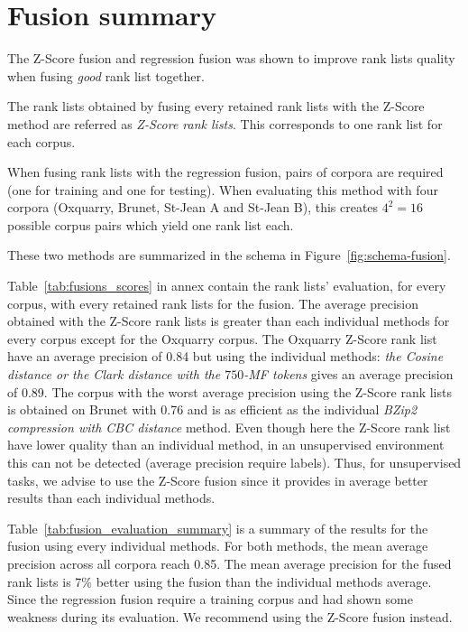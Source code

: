 \section{Fusion summary}

The Z-Score fusion and regression fusion was shown to improve rank lists quality when fusing \textit{good} rank list together.

The rank lists obtained by fusing every retained rank lists with the Z-Score method are referred as \textit{Z-Score rank lists}.
This corresponds to one rank list for each corpus.

When fusing rank lists with the regression fusion, pairs of corpora are required (one for training and one for testing).
When evaluating this method with four corpora (Oxquarry, Brunet, St-Jean A and St-Jean B), this creates $4^2 = 16$ possible corpus pairs which yield one rank list each.

These two methods are summarized in the schema in Figure~\ref{fig:schema-fusion}.

Table~\ref{tab:fusions_scores} in annex contain the rank lists' evaluation, for every corpus, with every retained rank lists for the fusion.
The average precision obtained with the Z-Score rank lists is greater than each individual methods for every corpus except for the Oxquarry corpus.
The Oxquarry Z-Score rank list have an average precision of 0.84 but using the individual methods: \textit{the Cosine distance or the Clark distance with the $750$-MF tokens} gives an average precision of 0.89.
The corpus with the worst average precision using the Z-Score rank lists is obtained on Brunet with 0.76 and is as efficient as the individual \textit{BZip2 compression with CBC distance} method.
Even though here the Z-Score rank list have lower quality than an individual method, in an unsupervised environment this can not be detected (average precision require labels).
Thus, for unsupervised tasks, we advise to use the Z-Score fusion since it provides in average better results than each individual methods.

Table~\ref{tab:fusion_evaluation_summary} is a summary of the results for the fusion using every individual methods.
For both methods, the mean average precision across all corpora reach 0.85.
The mean average precision for the fused rank lists is 7\% better using the fusion than the individual methods average.
Since the regression fusion require a training corpus and had shown some weakness during its evaluation.
We recommend using the Z-Score fusion instead.

